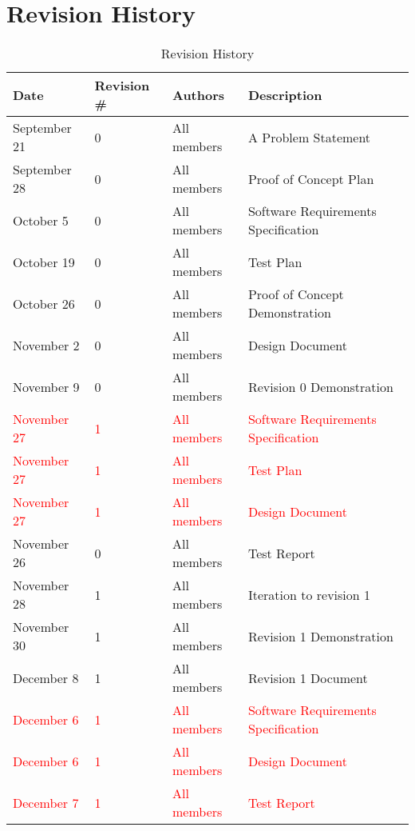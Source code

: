 \documentclass[12pt]{article}
\begin{document}
\section{Revision History}
\begin{table}[H]
\centering
      \caption{Revision History}
        \label{tab:table2}
      \begin{tabular}{ | p{4cm} | p{2cm} | p{4cm} | p{4cm}  | }
        \hline
            \textbf{Date} & \textbf{Revision \#} & \textbf{Authors} & \textbf{Description} \\
        \hline
          September 21 & 0 & All members & A Problem Statement  \\
        \hline
          September 28 & 0 & All members & Proof of Concept Plan \\
        \hline
          October 5 & 0 & All members & Software Requirements Specification \\
        \hline
          October 19 & 0 & All members & Test Plan \\
        \hline
          October 26 & 0 & All members & Proof of Concept Demonstration \\
        \hline
          November 2 & 0 & All members & Design Document \\
        \hline
          November 9 & 0 & All members & Revision 0 Demonstration \\
        \hline
          \textcolor{red}{ November 27} & \textcolor{red}{1} & \textcolor{red}{All members} & \textcolor{red}{Software Requirements Specification} \\
        \hline
          \textcolor{red}{ November 27} & \textcolor{red}{1} & \textcolor{red}{All members} & \textcolor{red}{Test Plan} \\
        \hline
          \textcolor{red}{ November 27} & \textcolor{red}{1} & \textcolor{red}{All members} & \textcolor{red}{Design Document} \\
        \hline
          November 26 & 0 & All members & Test Report \\
        \hline
          November 28 & 1 & All members & Iteration to revision 1 \\
        \hline
          November 30 & 1 & All members & Revision 1 Demonstration \\
        \hline
          December 8 & 1 & All members & Revision 1 Document \\
        \hline
         \textcolor{red}{ December 6} & \textcolor{red}{1} & \textcolor{red}{All members} & \textcolor{red}{Software Requirements Specification} \\
        \hline
          \textcolor{red}{ December 6} & \textcolor{red}{1} & \textcolor{red}{All members} & \textcolor{red}{Design Document} \\
        \hline
          \textcolor{red}{ December 7} & \textcolor{red}{1} & \textcolor{red}{All members} & \textcolor{red}{Test Report} \\
        \hline
      \end{tabular}
  \end{table}
\end{document}
